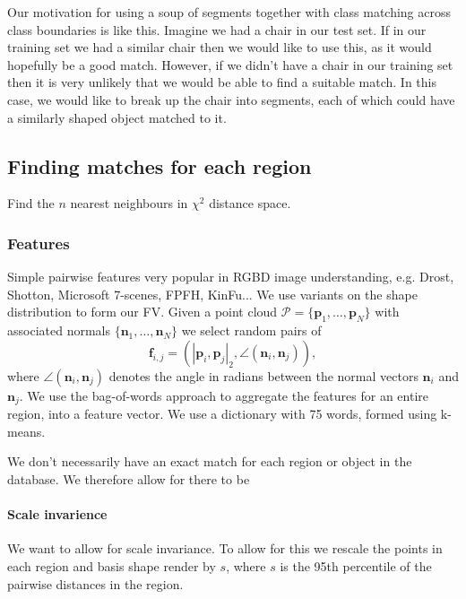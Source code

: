 \documentclass[10pt,a4paper, twocolumn]{article}
\newcommand{\pcloud}{\mathcal{P}}
\newcommand{\point}{\mathbf{p}}
\newcommand{\normal}{\mathbf{n}}
\begin{document}
Our motivation for using a soup of segments together with class matching across class boundaries is like this. 
Imagine we had a chair in our test set. If in our training set we had a similar chair then we would like to use this, as it would hopefully be a good match. 
However, if we didn't have a chair in our training set then it is very unlikely that we would be able to find a suitable match. 
In this case, we would like to break up the chair into segments, each of which could have a similarly shaped object matched to it.

\subsection{Finding matches for each region}

Find the $n$ nearest neighbours in $\chi^2$ distance space.

\subsubsection{Features}

Simple pairwise features very popular in RGBD image understanding, e.g. Drost, Shotton, Microsoft 7-scenes, FPFH, KinFu... 
We use variants on the shape distribution \cite{osada-csma-2001} to form our FV. 
Given a point cloud $\pcloud = \{\point_1, \hdots, \point_N\}$ with associated normals $\{\normal_1, \hdots, \normal_N\}$ we select random pairs of 
$$
\mathbf{f}_{i,j} = \left(|\point_i, \point_j|_2, \angle(\normal_i, \normal_j)\right),
$$
where $\angle(\normal_i,\normal_j)$ denotes the angle in radians between the normal vectors $\normal_i$ and $\normal_j$.
We use the bag-of-words approach to aggregate the features for an entire region, into a feature vector. We use a dictionary with 75 words, formed using k-means.

We don't necessarily have an exact match for each region or object in the database. We therefore allow for there to be 

\paragraph{Scale invarience}
We want to allow for scale invariance. To allow for this we rescale the points in each region and basis shape render by $s$, where $s$ is the 95th percentile of the pairwise distances in the region.
\end{document}
